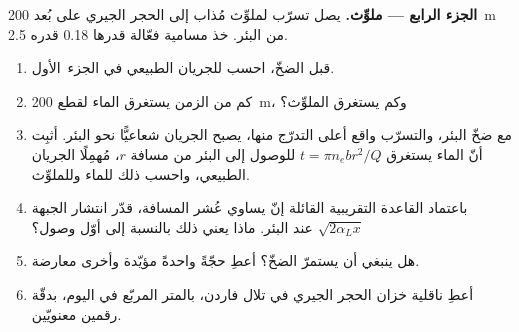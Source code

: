 \begin{problem}
\medskip\noindent\textbf{الجزء الرابع --- ملوِّث.} يصل تسرّب لملوِّث مُذاب
إلى الحجر الجيري على بُعد \qty{200}{m} من البئر. خذ
مسامية فعّالة قدرها 0.18  قدره 2.5.
\begin{enumerate}[resume]
\item قبل الضخّ، احسب   للجريان الطبيعي في الجزء~الأول.
\item كم من الزمن يستغرق الماء لقطع \qty{200}{m}، وكم يستغرق
  الملوِّث؟
\item مع ضخّ البئر، والتسرّب واقع أعلى التدرّج منها، يصبح الجريان
  شعاعيًّا نحو البئر. أثبِت أنّ الماء يستغرق $t = \pi n_e b
  r^2/Q$ للوصول إلى البئر من مسافة $r$، مُهمِلًا الجريان الطبيعي،
  واحسب ذلك للماء وللملوِّث.
\item باعتماد القاعدة التقريبية القائلة إنّ  يساوي عُشر المسافة،
  قدّر انتشار الجبهة $\sqrt{2\alpha_Lx}$ عند البئر. ماذا
  يعني ذلك بالنسبة إلى أوّل وصول؟
\item هل ينبغي أن يستمرّ الضخّ؟ أعطِ حجّةً واحدةً مؤيّدة وأخرى معارضة.
\item أعطِ ناقلية خزان الحجر الجيري في تلال فاردن، بالمتر المربّع
  في اليوم، بدقّة رقمين معنويّين.
\end{enumerate}
\end{problem}
